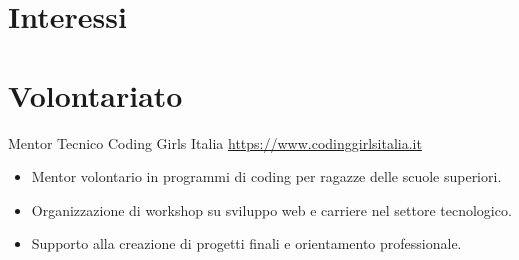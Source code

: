 \documentclass[a4paper, serif, 10pt]{moderncv}
\begin{document}
\section{Interessi}

\section{Volontariato}

        {Mentor Tecnico}
        {Coding Girls Italia}
        {\url{https://www.codinggirlsitalia.it}}
        {}
        {\begin{itemize}
\item Mentor volontario in programmi di coding per ragazze delle scuole superiori.
\item Organizzazione di workshop su sviluppo web e carriere nel settore tecnologico.
\item Supporto alla creazione di progetti finali e orientamento professionale.
\end{itemize}}
    
\end{document}
